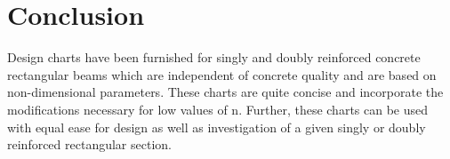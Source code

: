 \section{Conclusion}
Design charts have been furnished for singly and doubly reinforced concrete rectangular
beams which are independent of concrete quality and are based on non-dimensional
parameters. These charts are quite concise and incorporate the modiﬁcations necessary for
low values of n. Further, these charts can be used with equal ease for design as well as
investigation of a given singly or doubly reinforced rectangular section.





